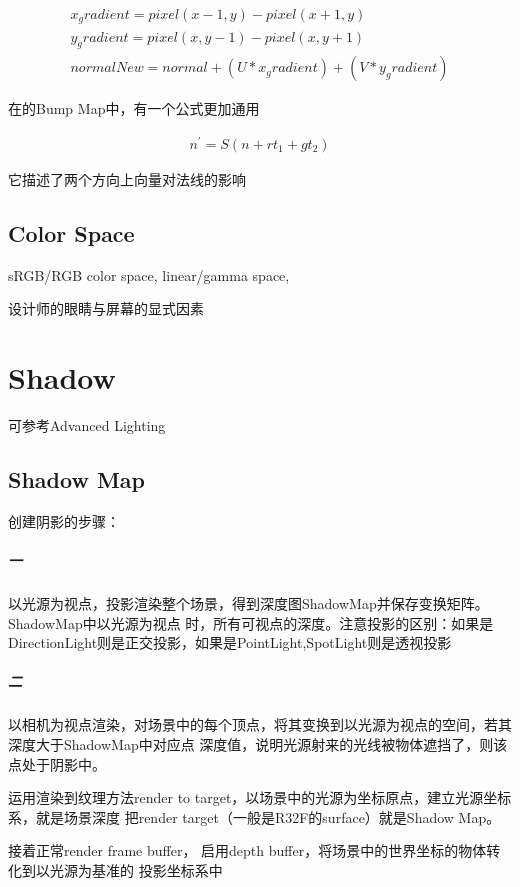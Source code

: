 \begin{gather*}
    x_gradient = pixel(x-1,y) - pixel(x+1,y) \\
    y_gradient = pixel(x,y-1) - pixel(x,y+1) \\
    normalNew = normal + (U * x_gradient) + (V * y_gradient)
\end{gather*}

在的Bump Map\cite{CGPP3ed}中，有一个公式更加通用

\begin{align*}
    n^{'} = S(n + rt_{1} + gt_{2})
\end{align*}

它描述了两个方向上向量对法线的影响

\section{Color Space}
sRGB/RGB color space, linear/gamma space, 

设计师的眼睛与屏幕的显式因素

\chapter{Shadow}

可参考Advanced Lighting\cite{LearnOpenGL}

\section{Shadow Map}

创建阴影的步骤：
\paragraph{一} 
以光源为视点，投影渲染整个场景，得到深度图ShadowMap并保存变换矩阵。ShadowMap中以光源为视点
时，所有可视点的深度。注意投影的区别：如果是DirectionLight则是正交投影，如果是PointLight,SpotLight则是透视投影

\paragraph{二}
以相机为视点渲染，对场景中的每个顶点，将其变换到以光源为视点的空间，若其深度大于ShadowMap中对应点
深度值，说明光源射来的光线被物体遮挡了，则该点处于阴影中。

运用渲染到纹理方法render to target，以场景中的光源为坐标原点，建立光源坐标系，就是场景深度
把render target（一般是R32F的surface）就是Shadow Map。 

接着正常render frame buffer， 启用depth buffer，将场景中的世界坐标的物体转化到以光源为基准的
投影坐标系中

